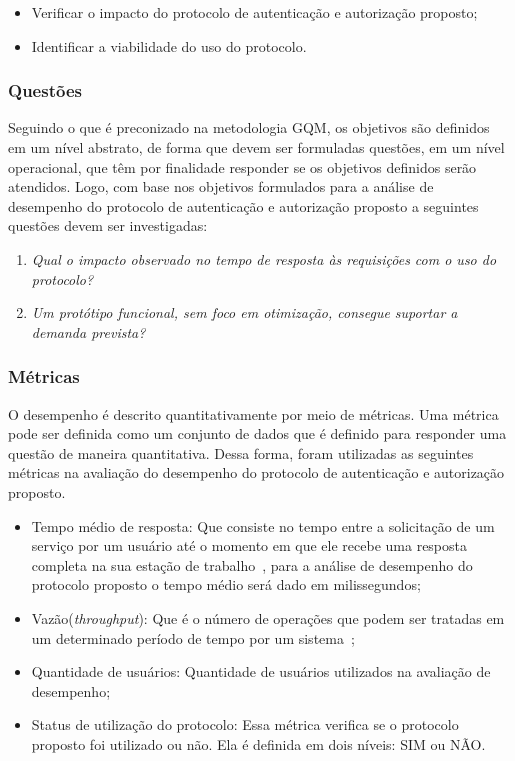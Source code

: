 \begin{itemize}
\item Verificar o impacto do protocolo de autenticação e autorização proposto;
\item Identificar a viabilidade do uso do protocolo.
\end{itemize}


\subsubsection{Questões}\label{sec:gqmquestoes}

Seguindo o que é preconizado na metodologia GQM, os objetivos são definidos em um nível abstrato, de forma que devem ser formuladas questões, em um nível operacional, que têm por finalidade responder se os objetivos definidos serão atendidos. Logo, com base nos objetivos formulados para a análise de desempenho do protocolo de autenticação e autorização proposto a seguintes questões devem ser investigadas:

\parbox{0.8\textwidth}{
\begin{enumerate}[(Q1)]
\item \emph{Qual o impacto observado no tempo de resposta às requisições com o uso do protocolo?}
\item \emph{Um protótipo funcional, sem foco em otimização, consegue suportar a demanda prevista?}
\end{enumerate}}

\subsubsection{Métricas}
O desempenho é descrito quantitativamente por meio de métricas. Uma métrica pode ser definida como um conjunto de dados que é definido para responder uma questão de maneira quantitativa. Dessa forma, foram utilizadas as seguintes métricas na avaliação do desempenho do protocolo de autenticação e autorização proposto.

\begin{itemize}
\item Tempo médio de resposta: Que consiste no tempo entre a solicitação de um serviço por um usuário até o momento em que ele recebe uma resposta completa na sua estação de trabalho~\cite{ Molyneaux2009}, para a análise de desempenho do protocolo proposto o tempo médio será dado em milissegundos;
\item Vazão(\emph{throughput}): Que é  o número de operações que podem ser tratadas em um determinado período de tempo por um sistema~\cite{ Molyneaux2009};

\item Quantidade de usuários: Quantidade de usuários utilizados na avaliação de desempenho;

\item Status de utilização do protocolo: Essa métrica verifica se o protocolo proposto foi utilizado ou não. Ela é definida em dois níveis: SIM ou  NÃO.
\end{itemize}

